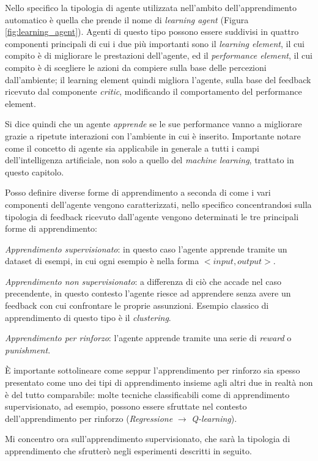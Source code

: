 \documentclass[../../main.tex]{subfiles}
\begin{document}
    Nello specifico la tipologia di agente utilizzata nell'ambito dell'apprendimento automatico è quella che prende il nome di \textit{learning agent} (Figura \ref{fig:learning_agent}). Agenti di questo tipo possono essere suddivisi in quattro componenti principali di cui i due più importanti sono il \textit{learning element}, il cui compito è di migliorare le prestazioni dell'agente, ed il \textit{performance element}, il cui compito è di scegliere le azioni da compiere sulla base delle percezioni dall'ambiente; il learning element quindi migliora l'agente, sulla base del feedback ricevuto dal componente \textit{critic}, modificando il comportamento del performance element.

    Si dice quindi che un agente \textit{apprende} se le sue performance vanno a migliorare grazie a ripetute interazioni con l'ambiente in cui è inserito.
    Importante notare come il concetto di agente sia applicabile in generale a tutti i campi dell'intelligenza artificiale, non solo a quello del \textit{machine learning}, trattato in questo capitolo.

    Posso definire diverse forme di apprendimento a seconda di come i vari componenti dell'agente vengono caratterizzati, nello specifico concentrandosi sulla tipologia di feedback ricevuto dall'agente vengono determinati le tre principali forme di apprendimento:

    \textit{Apprendimento supervisionato}: in questo caso l'agente apprende tramite un dataset di esempi, in cui ogni esempio è nella forma $<input, output>$.

    \textit{Apprendimento non supervisionato}: a differenza di ciò che accade nel caso precendente, in questo contesto l'agente riesce ad apprendere senza avere un feedback con cui confrontare le proprie assunzioni. Esempio classico di apprendimento di questo tipo è il \textit{clustering}.

    \textit{Apprendimento per rinforzo}: l'agente apprende tramite una serie di \textit{reward} o \textit{punishment}.

    È importante sottolineare come seppur l'apprendimento per rinforzo sia spesso presentato come uno dei tipi di apprendimento insieme agli altri due in realtà non è del tutto comparabile: molte tecniche classificabili come di apprendimento supervisionato, ad esempio, possono essere sfruttate nel contesto dell'apprendimento per rinforzo (\textit{Regressione} $\rightarrow$ \textit{Q-learning}).

    Mi concentro ora sull'apprendimento supervisionato, che sarà la tipologia di apprendimento che sfrutterò negli esperimenti descritti in seguito.
    
\end{document}
